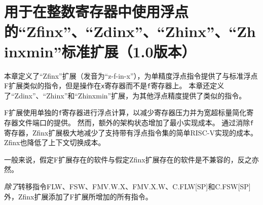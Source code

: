 \chapter{用于在整数寄存器中使用浮点的“Zfinx”、“Zdinx”、“Zhinx”、“Zhinxmin”标准扩展（1.0版本）}
\label{sec:zfinx}

本章定义了“Zfinx”扩展（发音为“z-f-in-x”），为单精度浮点指令提供了与标准浮点F扩展类似的指令，但是操作在{\tt x}寄存器而不是{\tt f}寄存器上。
本章还定义了“Zdinx”、“Zhinx”和“Zhinxmin”扩展，为其他浮点精度提供了类似的指令。

\begin{commentary}
F扩展使用单独的{\tt f}寄存器进行浮点计算，以减少寄存器压力并为宽超标量简化寄存器文件端口的提供。
然而，额外的架构状态增加了最小实现成本。
通过消除{\tt f}寄存器，Zfinx扩展极大地减少了支持带有浮点指令集的简单RISC-V实现的成本。Zfinx也降低了上下文切换成本。

一般来说，假定F扩展存在的软件与假定Zfinx扩展存在的软件是不兼容的，反之亦然。
\end{commentary}

{\em 除了}转移指令FLW、FSW、FMV.W.X、FMV.X.W、C.FLW[SP]和C.FSW[SP]外，Zfinx扩展添加了F扩展所增加的所有指令。

